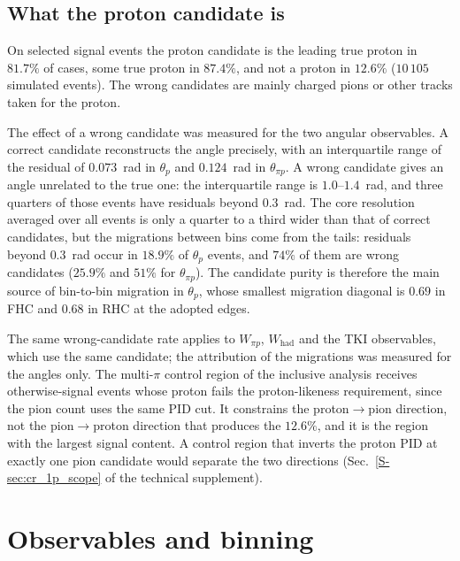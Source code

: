 \documentclass[11pt,a4paper]{article}
\newcommand{\suppref}[2]{#1~\ref{S-#2} of the technical supplement}
\begin{document}
\subsection{What the proton candidate is}
\label{sec:prmatch}

On selected signal events the proton candidate is the leading true proton in $81.7\%$ of cases,
some true proton in $87.4\%$, and not a proton in $12.6\%$ ($10\,105$ simulated events). The wrong
candidates are mainly charged pions or other tracks taken for the proton.

The effect of a wrong candidate was measured for the two angular observables. A correct candidate
reconstructs the angle precisely, with an interquartile range of the residual of $0.073$~rad in
$\theta_p$ and $0.124$~rad in $\theta_{\pi p}$. A wrong candidate gives an angle unrelated to the
true one: the interquartile range is $1.0$--$1.4$~rad, and three quarters of those events have
residuals beyond $0.3$~rad. The core resolution averaged over all events is only a quarter to a
third wider than that of correct candidates, but the migrations between bins come from the tails:
residuals beyond $0.3$~rad occur in $18.9\%$ of $\theta_p$ events, and $74\%$ of them are wrong
candidates ($25.9\%$ and $51\%$ for $\theta_{\pi p}$). The candidate purity is therefore the main
source of bin-to-bin migration in $\theta_p$, whose smallest migration diagonal is $0.69$ in FHC and
$0.68$ in RHC at the adopted edges.

The same wrong-candidate rate applies to $W_{\pi p}$, $W_\mathrm{had}$ and the TKI observables,
which use the same candidate; the attribution of the migrations was measured for the angles only.
The multi-$\pi$ control region of the inclusive analysis receives otherwise-signal events whose proton fails the proton-likeness requirement, since the
pion count uses the same PID cut. It constrains the proton$\to$pion direction, not the
pion$\to$proton direction that produces the $12.6\%$, and it is the region with the largest signal
content. A control region that inverts the proton PID at exactly one pion candidate would separate
the two directions (\suppref{Sec.}{sec:cr_1p_scope}).

\section{Observables and binning}
\label{sec:pt_observables}
\end{document}
